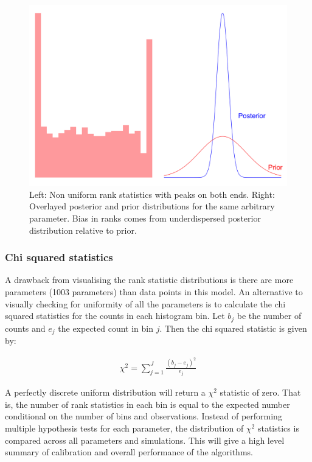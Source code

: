 \documentclass[12pt, a4paper]{article}
\begin{document}
            \begin{figure}[H]
                \centering
                \includegraphics[scale=0.07]{methodology/underdispersed.png}
                \caption{Left: Non uniform rank statistics with peaks on both ends. Right: Overlayed posterior and prior distributions for the same arbitrary parameter. Bias in ranks comes from underdispersed posterior distribution relative to prior.}
                \label{fig:underdispersed}
            \end{figure}

            \subsubsection{Chi squared statistics}
            A drawback from visualising the rank statistic distributions is there are more parameters (1003 parameters) than data points in this model. An alternative to visually checking for uniformity of all the parameters is to calculate the chi squared statistics for the counts in each histogram bin. Let $b_j$ be the number of counts and $e_j$ the expected count in bin $j$. Then the chi squared statistic is given by:
            
            $$
            \begin{aligned}
            \chi^2 = \sum_{j=1}^J \frac{(b_{j} - e_{j})^2}{e_j}
            \end{aligned}
            $$
            
            A perfectly discrete uniform distribution will return a $\chi^2$ statistic of zero. That is, the number of rank statistics in each bin is equal to the expected number conditional on the number of bins and observations. Instead of performing multiple hypothesis tests for each parameter, the distribution of $\chi^2$ statistics is compared across all parameters and simulations. This will give a high level summary of calibration and overall performance of the algorithms.
\end{document}
